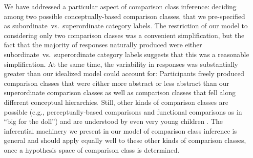 \documentclass[doc, floatsintext]{apa6}
\begin{document}

We have addressed a particular aspect of comparison class inference: deciding among two possible conceptually-based comparison classes, that we pre-specified as subordinate~vs.~superordinate category labels.
The restriction of our model to considering only two comparison classes was a convenient simplification, but the fact that the majority of responses naturally produced were either subordinate~vs.~superordinate category labels suggests that this was a reasonable simplification. 
At the same time, the variability in responses was substantially greater than our idealized model could account for: Participants freely produced comparison classes that were either more abstract or less abstract than our superordinate comparison classes as well as comparison classes that fell along different conceptual hierarchies. 
Still, other kinds of comparison classes are possible (e.g., perceptually-based comparisons and functional comparisons as in ``big for the doll'') and are understood by even very young children \cite{Ebeling1994}.
The inferential machinery we present in our model of comparison class inference is general and should apply equally well to these other kinds of comparison classes, once a hypothesis space of comparison class is determined.
\end{document}
